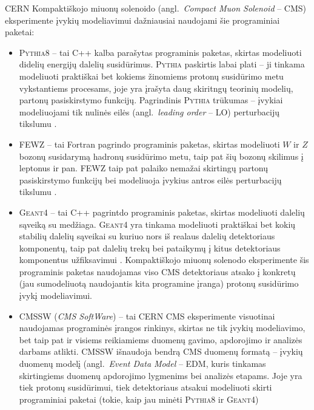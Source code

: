 \documentclass[a4paper, 12pt]{article}
\begin{document}
CERN Kompaktiškojo miuonų solenoido (angl.\ \textit{Compact Muon Solenoid} -- CMS) eksperimente
įvykių modeliavimui dažniausiai naudojami šie programiniai paketai:
\begin{itemize}
	\item \textsc{Pythia8} -- tai C++ kalba parašytas programinis paketas, skirtas modeliuoti
	didelių energijų dalelių susidūrimus.
	\textsc{Pythia} paskirtis labai plati -- ji tinkama modeliuoti praktiškai bet kokiems žinomiems protonų
	susidūrimo metu vykstantiems procesams, joje yra įrašyta daug skiritngų teorinių modelių,
	partonų pasiskirstymo funkcijų.
	Pagrindinis \textsc{Pythia} trūkumas -- įvykiai modeliuojami tik nulinės eilės (angl.\
	\textit{leading order} -- LO) perturbacijų tikslumu \cite{pythia82}.
	
	\item FEWZ -- tai Fortran pagrindo programinis paketas, skirtas modeliuoti  $W$ ir $Z$
	bozonų susidarymą hadronų susidūrimo metu, taip pat šių bozonų skilimus į leptonus ir pan.
	FEWZ taip pat palaiko nemažai skirtingų partonų pasiskirstymo funkcijų bei modeliuoja įvykius
	antros eilės perturbacijų tikslumu \cite{fewz}.
	
	\item \textsc{Geant4} -- tai C++ pagrintdo programinis paketas, skirtas modeliuoti dalelių sąveiką
	su medžiaga.
	\textsc{Geant4} yra tinkama modeliuoti praktiškai bet kokių stabilių dalelių sąveikai su kuriuo nors iš
	realaus dalelių detektoriaus komponentų, taip pat dalelių trekų bei pataikymų į kitus detektoriaus
	komponentus užfiksavimui \cite{geant4}.
	Kompaktiškojo miuonų solenodo eksperimente šis programinis paketas naudojamas viso CMS detektoriaus
	atsako į konkretų (jau sumodeliuotą naudojantis kita programine įranga) protonų susidūrimo įvykį
	modeliavimui.
	
	\item CMSSW (\textit{CMS SoftWare}) -- tai CERN CMS eksperimente visuotinai naudojamas programinės
	įrangos rinkinys, skirtas ne tik įvykių modeliavimo, bet taip pat ir  visiems reikiamiems duomenų
	gavimo, apdorojimo ir analizės darbams atlikti.
	CMSSW išnaudoja bendrą CMS duomenų formatą -- įvykių duomenų modelį (angl.\ \textit{Event Data Model}
	-- EDM, kuris tinkamas skirtingiems duomenų apdorojimo lygmenims bei analizės etapams.
	Joje yra tiek protonų susidūrimui, tiek detektoriaus atsakui modeliuoti skirti programiniai paketai
	(tokie, kaip jau minėti \textsc{Pythia8} ir \textsc{Geant4})
\end{itemize}
\end{document}
